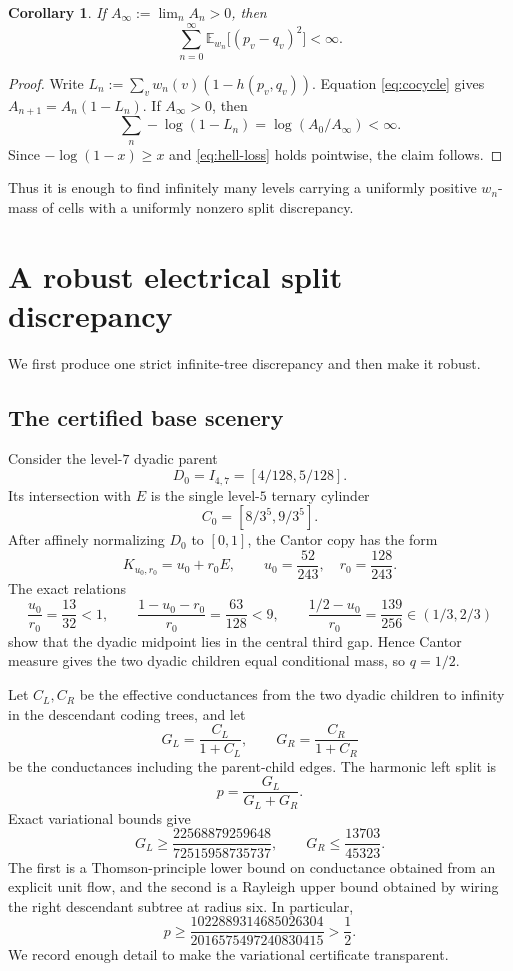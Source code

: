\documentclass[11pt]{article}
\newtheorem{corollary}[theorem]{Corollary}
\theoremstyle{remark}
\newcommand{\E}{\mathbb E}
\begin{document}
\begin{corollary}\label{cor:finite-series}
If $A_\infty:=\lim_nA_n>0$, then
\[
 \sum_{n=0}^\infty \E_{w_n}\big[(p_v-q_v)^2\big]<\infty.
\]
\end{corollary}

\begin{proof}
Write $L_n:=\sum_vw_n(v)(1-h(p_v,q_v))$.  Equation \eqref{eq:cocycle} gives $A_{n+1}=A_n(1-L_n)$.  If $A_\infty>0$, then
\[
 \sum_n -\log(1-L_n)=\log(A_0/A_\infty)<\infty.
\]
Since $-\log(1-x)\ge x$ and \eqref{eq:hell-loss} holds pointwise, the claim follows.
\end{proof}

Thus it is enough to find infinitely many levels carrying a uniformly positive $w_n$-mass of cells with a uniformly nonzero split discrepancy.

\section{A robust electrical split discrepancy}

We first produce one strict infinite-tree discrepancy and then make it robust.

\subsection{The certified base scenery}

Consider the level-$7$ dyadic parent
\[
 D_0=I_{4,7}=[4/128,5/128].
\]
Its intersection with $E$ is the single level-$5$ ternary cylinder
\[
 C_0=[8/3^5,9/3^5].
\]
After affinely normalizing $D_0$ to $[0,1]$, the Cantor copy has the form
\[
 K_{u_0,r_0}=u_0+r_0E,\qquad
 u_0=\frac{52}{243},\quad r_0=\frac{128}{243}.
\]
The exact relations
\[
 \frac{u_0}{r_0}=\frac{13}{32}<1,
 \qquad
 \frac{1-u_0-r_0}{r_0}=\frac{63}{128}<9,
 \qquad
 \frac{1/2-u_0}{r_0}=\frac{139}{256}\in(1/3,2/3)
\]
show that the dyadic midpoint lies in the central third gap.  Hence Cantor measure gives the two dyadic children equal conditional mass, so $q=1/2$.

Let $C_L,C_R$ be the effective conductances from the two dyadic children to infinity in the descendant coding trees, and let
\[
 G_L=\frac{C_L}{1+C_L},\qquad G_R=\frac{C_R}{1+C_R}
\]
be the conductances including the parent-child edges.  The harmonic left split is
\[
 p=\frac{G_L}{G_L+G_R}.
\]
Exact variational bounds give
\begin{equation}\label{eq:branch-bounds}
 G_L\ge \frac{22568879259648}{72515958735737},
 \qquad
 G_R\le \frac{13703}{45323}.
\end{equation}
The first is a Thomson-principle lower bound on conductance obtained from an explicit unit flow, and the second is a Rayleigh upper bound obtained by wiring the right descendant subtree at radius six.  In particular,
\begin{equation}\label{eq:split-lower}
 p\ge
 \frac{1022889314685026304}{2016575497240830415}
 >\frac12.
\end{equation}
We record enough detail to make the variational certificate transparent.
\end{document}
